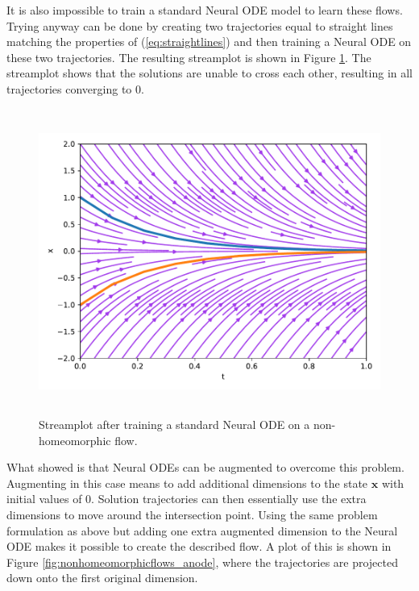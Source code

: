 \documentclass[12pt,a4paper]{book}
\begin{document}
It is also impossible to train a standard Neural ODE model to learn these flows. Trying anyway can be done by creating two trajectories equal to straight lines matching the properties of (\ref{eq:straightlines}) and then training a Neural ODE on these two trajectories. The resulting streamplot is shown in Figure \ref{fig:nonhomeomorphicflows_node}. The streamplot shows that the solutions are unable to cross each other, resulting in all trajectories converging to 0.

\begin{figure}[H]
    \centering
    \includegraphics[height=10cm]{figs/nonhomeomorphicflows_node.pdf}
    \caption{Streamplot after training a standard Neural ODE on a non-homeomorphic flow.}
    \label{fig:nonhomeomorphicflows_node}
\end{figure}

What \cite{dupont2019augmented} showed is that Neural ODEs can be augmented to overcome this problem. Augmenting in this case means to add additional dimensions to the state $\bm{x}$ with initial values of 0. Solution trajectories can then essentially use the extra dimensions to move around the intersection point. Using the same problem formulation as above but adding one extra augmented dimension to the Neural ODE makes it possible to create the described flow. A plot of this is shown in Figure \ref{fig:nonhomeomorphicflows_anode}, where the trajectories are projected down onto the first original dimension.
\end{document}
